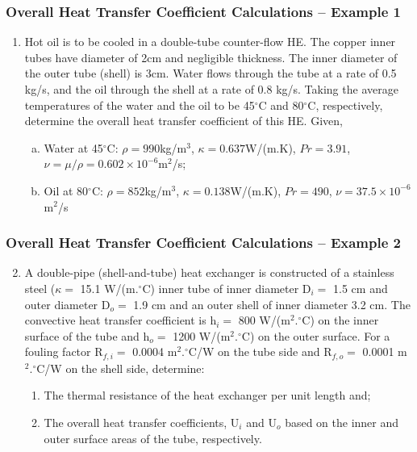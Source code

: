 \documentclass[10pt,compress]{beamer}
\begin{document}
\begin{frame}
  \frametitle{Overall Heat Transfer Coefficient Calculations -- Example 1}
     \begin{enumerate}
          \item Hot oil is to be cooled in a double-tube counter-flow HE. The copper inner tubes have diameter of 2cm and negligible thickness. The inner diameter of the outer tube (shell) is 3cm. Water flows through the tube at a rate of 0.5 kg/s, and the oil through the shell at a rate of 0.8 kg/s. Taking the average temperatures of the water and the oil to be 45$^{\circ}$C and 80$^{\circ}$C, respectively, determine the overall heat transfer coefficient of this HE. Given, 
       \begin{enumerate}[(a)]
          \item Water at 45$^{\circ}$C: $\rho=990$kg/m$^{3}$, $\kappa=0.637$W/(m.K), $Pr=3.91$, $\nu=\mu/\rho=0.602\times 10^{-6}$m$^{2}$/s; 
          \item Oil at 80$^{\circ}$C: $\rho=852$kg/m$^{3}$, $\kappa=0.138$W/(m.K), $Pr=490$, $\nu=37.5\times 10^{-6}$m$^{2}$/s
       \end{enumerate}
     \end{enumerate}

\end{frame}


\begin{frame}
  \frametitle{Overall Heat Transfer Coefficient Calculations -- Example 2}
     \begin{enumerate}\setcounter{enumi}{1}
          \item A double-pipe (shell-and-tube) heat exchanger is constructed of a stainless steel ($\kappa=$ 15.1 W/(m.$^{\circ}$C) inner tube of inner diameter D$_{i}=$ 1.5 cm and outer diameter D$_{o}=$ 1.9 cm and an outer shell of inner diameter 3.2 cm. The convective heat transfer coefficient is h$_{i}=$ 800 W/(m$^{2}.^{\circ}$C) on the inner surface of the tube and h$_{o}=$ 1200 W/(m$^{2}.^{\circ}$C) on the outer surface. For a fouling factor R$_{f,i}=$ 0.0004 m$^{2}.^{\circ}$C/W on the tube side and R$_{f,o}=$ 0.0001 m$^{2}.^{\circ}$C/W on the shell side, determine:
              \begin{enumerate}
                  \item The thermal resistance of the heat exchanger per unit length and; 
                  \item The overall heat transfer coefficients, U$_{i}$ and U$_{o}$ based on the inner and outer surface areas of the tube, respectively.
              \end{enumerate}

     \end{enumerate}

\end{frame}
\end{document}
